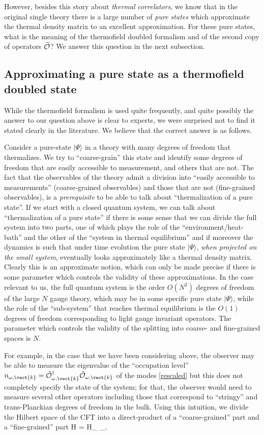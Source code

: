 However, besides this story about {\it thermal correlators}, we know that in the original single theory there is a large number of {\it pure states} which approximate the thermal density matrix to an excellent approximation. For these pure states, what is the meaning of the thermofield doubled formalism and of the second copy of operators $\widetilde{\cal O}$? We answer this question in the next subsection.

\subsection{Approximating a  pure state as a thermofield doubled state}
While the thermofield formalism is used quite frequently, and quite possibly the answer to our question above is clear to experts, we were surprised not to find it stated clearly in the literature.  We believe that the correct answer is as follows. 

Consider a pure-state $|\Psi\rangle$ in a theory with many degrees of freedom that thermalizes. We try to ``coarse-grain'' this state and identify some degrees of freedom that are easily accessible to measurement, and others that are not. The fact that the observables of the theory admit a division into ``easily accessible to measurements'' (coarse-grained observables) and those that are not (fine-grained observables), is a {\it prerequisite} to be able to talk about  ``thermalization of a pure state''. If we start with a closed quantum system, we can talk about ``thermalization of a pure state'' if there is some sense that we can divide the full system into two parts, one of which plays the role of the 
``environment/heat-bath'' and the other of the ``system in thermal equilibrium'' and if moreover the dynamics is such that under time evolution the pure state $|\Psi\rangle$, {\it when projected on the small system}, eventually looks approximately like a thermal density matrix. Clearly this is an approximate notion, which can only be made precise if there is some parameter which controls the validity of these approximations. In the case relevant to us, the full quantum system is the order $O(N^2)$ degrees of freedom of the large $N$ gauge theory, which may be in some specific pure state $|\Psi\rangle$, while the role of the ``sub-system'' that reaches thermal equilibrium is the $O(1)$ degrees of freedom corresponding to light gauge invariant operators. The parameter which controls the validity of the splitting into coarse- and fine-grained spaces is $N$.


For example, in the case that we have been considering above, the observer may be able to measure the eigenvalue of the ``occupation level'' $n_{\omega,\vect{k}} = \hat{\cal O}^{\dagger}_{\omega, \vect{k}} \hat{\cal O}_{\omega, \vect{k}}$ of the modes \eqref{rescaled} but this does not completely specify the state of the system; for that, the observer would need to measure several other operators including those that correspond to ``stringy'' and trans-Planckian degrees of freedom in the bulk. Using this intuition, we divide the Hilbert space of the CFT into a direct-product of a ``coarse-grained'' part and a ``fine-grained'' part
\be
\label{hcoarsefine}
{\cal H} = {\cal H}_{} _{}.
 \ee

